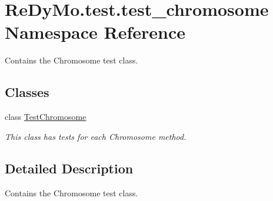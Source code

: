 \hypertarget{namespaceReDyMo_1_1test_1_1test__chromosome}{}\section{Re\+Dy\+Mo.\+test.\+test\+\_\+chromosome Namespace Reference}
\label{namespaceReDyMo_1_1test_1_1test__chromosome}


Contains the Chromosome test class.  


\subsection*{Classes}
\begin{DoxyCompactItemize}
\item 
class \mbox{\hyperlink{classReDyMo_1_1test_1_1test__chromosome_1_1TestChromosome}{Test\+Chromosome}}
\begin{DoxyCompactList}\small\item\em This class has tests for each Chromosome method. \end{DoxyCompactList}\end{DoxyCompactItemize}


\subsection{Detailed Description}
Contains the Chromosome test class. 